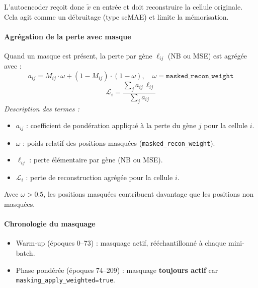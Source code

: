 \documentclass[11pt,a4paper]{article}
\begin{document}
L'autoencoder re\c{c}oit donc $\tilde{x}$ en entr\'ee et doit reconstruire la cellule originale. Cela agit comme un d\'ebruitage (type scMAE) et limite la m\'emorisation.

\paragraph{Agr\'egation de la perte avec masque}
Quand un masque est pr\'esent, la perte par g\`ene $\ell_{ij}$ (NB ou MSE) est agr\'eg\'ee avec :
\[
a_{ij} = M_{ij}\cdot\omega + (1-M_{ij})\cdot(1-\omega), \quad \omega=\texttt{masked\_recon\_weight}
\]
\[
\mathcal{L}_i = \frac{\sum_j a_{ij}\,\ell_{ij}}{\sum_j a_{ij}}
\]
\textit{Description des termes :}
\begin{itemize}[nosep]
  \item $a_{ij}$ : coefficient de pond\'eration appliqu\'e \`a la perte du g\`ene $j$ pour la cellule $i$.
  \item $\omega$ : poids relatif des positions masqu\'ees (\texttt{masked\_recon\_weight}).
  \item $\ell_{ij}$ : perte \'el\'ementaire par g\`ene (NB ou MSE).
  \item $\mathcal{L}_i$ : perte de reconstruction agr\'eg\'ee pour la cellule $i$.
\end{itemize}
Avec $\omega>0.5$, les positions masqu\'ees contribuent davantage que les positions non masqu\'ees.

\paragraph{Chronologie du masquage}
\begin{itemize}[nosep]
  \item Warm-up (\'epoques 0--73) : masquage actif, r\'e\'echantillonn\'e \`a chaque mini-batch.
  \item Phase pond\'er\'ee (\'epoques 74--209) : masquage \textbf{toujours actif} car \texttt{masking\_apply\_weighted=true}.
\end{itemize}
\end{document}
